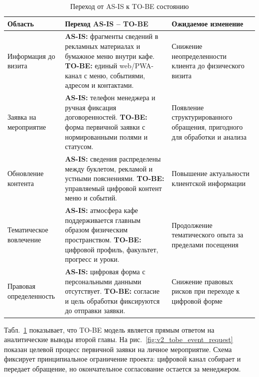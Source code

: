 \begin{table}[H]
\centering
\small
\caption{Переход от AS-IS к TO-BE состоянию}
\label{tab:ch3_asis_tobe_transition}
\begin{tabularx}{\textwidth}{|>{\raggedright\arraybackslash}p{}|>{\raggedright\arraybackslash}p{}|>{\raggedright\arraybackslash}X|}
\hline
\textbf{Область} & \textbf{Переход AS-IS -- TO-BE} & \textbf{Ожидаемое изменение} \\ \hline
Информация до визита & \textbf{AS-IS:} фрагменты сведений в рекламных материалах и бумажное меню внутри кафе. \newline \textbf{TO-BE:} единый web/PWA-канал с меню, событиями, адресом и контактами. & Снижение неопределенности клиента до физического визита \\ \hline
Заявка на мероприятие & \textbf{AS-IS:} телефон менеджера и ручная фиксация договоренностей. \newline \textbf{TO-BE:} форма первичной заявки с нормированными полями и статусом. & Появление структурированного обращения, пригодного для обработки и анализа \\ \hline
Обновление контента & \textbf{AS-IS:} сведения распределены между буклетом, рекламой и устными пояснениями. \newline \textbf{TO-BE:} управляемый цифровой контент меню и событий. & Повышение актуальности клиентской информации \\ \hline
Тематическое вовлечение & \textbf{AS-IS:} атмосфера кафе поддерживается главным образом физическим пространством. \newline \textbf{TO-BE:} цифровой профиль, факультет, прогресс и уроки. & Продолжение тематического опыта за пределами посещения \\ \hline
Правовая определенность & \textbf{AS-IS:} цифровая форма с персональными данными отсутствует. \newline \textbf{TO-BE:} согласие и цель обработки фиксируются до отправки заявки. & Снижение правовых рисков при переходе к цифровой форме \\ \hline
\end{tabularx}
\normalsize
\end{table}

Табл.~\ref{tab:ch3_asis_tobe_transition} показывает, что TO-BE модель является прямым ответом на аналитические выводы второй главы. На рис.~\ref{fig:v2_tobe_event_request} показан целевой процесс первичной заявки на личное мероприятие. Схема фиксирует принципиальное ограничение проекта: цифровой канал собирает и передает обращение, но окончательное согласование остается за менеджером.

